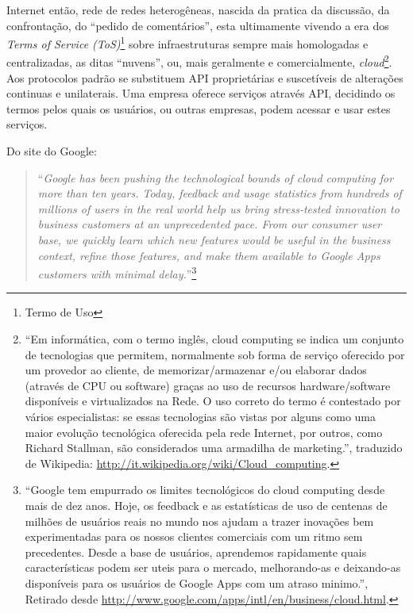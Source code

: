 Internet então, rede de redes heterogêneas, nascida da pratica da
discussão, da confrontação, do ``pedido de comentários'', esta
ultimamente vivendo a era dos \emph{Terms of Service
  (ToS)}\footnote{Termo de Uso} sobre infraestruturas sempre mais
homologadas e centralizadas, as ditas ``nuvens'', ou, mais geralmente
e comercialmente, \emph{cloud}\footnote{``Em informática, com o termo
  inglês, cloud computing se indica um conjunto de tecnologias que
  permitem, normalmente sob forma de serviço oferecido por um provedor
ao cliente, de memorizar/armazenar e/ou elaborar dados (através de CPU
ou software) graças ao uso de recursos hardware/software disponíveis e
virtualizados na Rede. O uso correto do termo é contestado por vários
especialistas: se essas tecnologias são vistas por alguns como uma maior
evolução tecnológica oferecida pela rede Internet, por outros, como
Richard Stallman, são considerados uma armadilha de marketing.'',
traduzido de Wikipedia:
\url{http://it.wikipedia.org/wiki/Cloud_computing}.}. Aos protocolos
padrão se substituem API proprietárias e suscetíveis de alterações
continuas e unilaterais. Uma empresa oferece serviços através API,
decidindo os termos pelos quais os usuários, ou outras empresas, podem
acessar e usar estes serviços.  

Do site do Google:
\begin{quote}
  ``\emph{Google has been pushing the technological bounds of cloud
    computing for more than ten years. Today, feedback and usage
    statistics from hundreds of millions of users in the real world
    help us bring stress-tested innovation to business customers at an
    unprecedented pace. From our consumer user base, we quickly learn
    which new features would be useful in the business context, refine
    those features, and make them available to Google Apps customers
    with minimal delay.}''\footnote{``Google tem empurrado os limites
    tecnológicos do cloud computing desde mais de dez anos. Hoje, os
    feedback e as estatísticas de uso de centenas de milhões de
    usuários reais no mundo nos ajudam a trazer inovações bem
    experimentadas para os nossos clientes comerciais com um ritmo sem
    precedentes.  Desde a base de usuários, aprendemos rapidamente
    quais características podem ser uteis para o mercado,
    melhorando-as e deixando-as disponíveis para os usuários de Google
    Apps com um atraso minimo.'', Retirado desde
    \url{http://www.google.com/apps/intl/en/business/cloud.html}.}
\end{quote}

